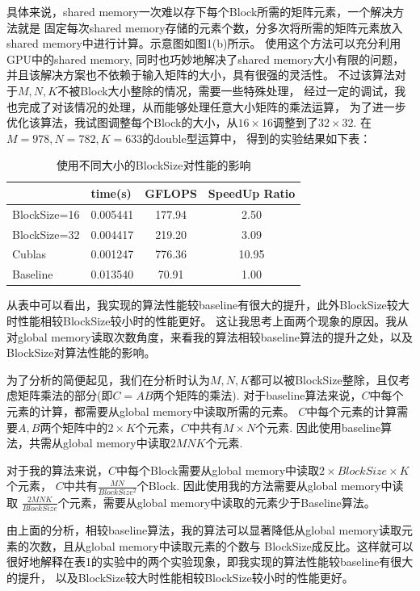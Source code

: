 \documentclass[UTF8]{article}
\begin{document}
具体来说，shared memory一次难以存下每个Block所需的矩阵元素，一个解决方法就是
固定每次shared memory存储的元素个数，分多次将所需的矩阵元素放入shared memory中进行计算。示意图如图1(b)所示。
使用这个方法可以充分利用GPU中的shared memory, 同时也巧妙地解决了shared memory大小有限的问题，并且该解决方案也不依赖于输入矩阵的大小，具有很强的灵活性。
不过该算法对于$M, N, K$不被Block大小整除的情况，需要一些特殊处理，
经过一定的调试，我也完成了对该情况的处理，从而能够处理任意大小矩阵的乘法运算，
\clearpage
为了进一步优化该算法，我试图调整每个Block的大小，从$16\times 16$调整到了$32\times 32$.
在$M=978, N=782, K=633$的double型运算中，
得到的实验结果如下表：
\begin{table}[h]
    \caption{使用不同大小的BlockSize对性能的影响}
    \label{tab:my-table}
    \centering
    \begin{tabular}{|l|c|c|c|}
    \hline
     & \multicolumn{1}{l|}{time(s)} & \multicolumn{1}{l|}{GFLOPS} & \multicolumn{1}{l|}{SpeedUp Ratio} \\ \hline
    BlockSize=16 & 0.005441 & 177.94 & 2.50  \\ \hline
    BlockSize=32 & 0.004417 & 219.20 & 3.09  \\ \hline
    Cublas       & 0.001247 & 776.36 & 10.95 \\ \hline
    Baseline     & 0.013540 & 70.91  & 1.00  \\ \hline
    \end{tabular}
    \end{table}
从表中可以看出，我实现的算法性能较baseline有很大的提升，此外BlockSize较大时性能相较BlockSize较小时的性能更好。
这让我思考上面两个现象的原因。我从对global memory读取次数角度，来看我的算法相较baseline算法的提升之处，以及BlockSize对算法性能的影响。

为了分析的简便起见，我们在分析时认为$M, N, K$都可以被BlockSize整除，且仅考虑矩阵乘法的部分(即$C=AB$两个矩阵的乘法).
对于baseline算法来说，$C$中每个元素的计算，都需要从global memory中读取所需的元素。
$C$中每个元素的计算需要$A, B$两个矩阵中的$2\times K$个元素，$C$中共有$M\times N$个元素.
因此使用baseline算法，共需从global memory中读取$2MNK$个元素.

对于我的算法来说，$C$中每个Block需要从global memory中读取$2\times BlockSize\times K$个元素，
$C$中共有$\frac{MN}{BlockSize^2}$个Block. 因此使用我的方法需要从global memory中读取
$\frac{2MNK}{BlockSize}$个元素，需要从global memory中读取的元素少于Baseline算法。

由上面的分析，相较baseline算法，我的算法可以显著降低从global memory读取元素的次数，且从global memory中读取元素的个数与
BlockSize成反比。这样就可以很好地解释在表1的实验中的两个实验现象，即我实现的算法性能较baseline有很大的提升，
以及BlockSize较大时性能相较BlockSize较小时的性能更好。
\end{document}
